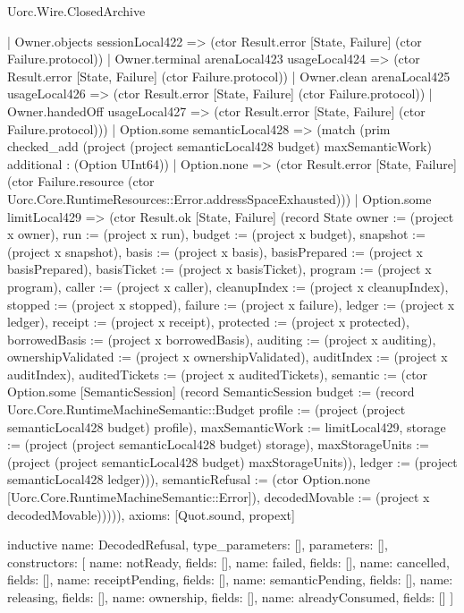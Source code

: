 \begin{lexlean}{Uorc.Wire.ClosedArchive}
\begin{semanticmodule}
{      | Owner.objects sessionLocal422 => (ctor Result.error [State, Failure] (ctor Failure.protocol))
      | Owner.terminal arenaLocal423 usageLocal424 => (ctor Result.error [State, Failure] (ctor Failure.protocol))
      | Owner.clean arenaLocal425 usageLocal426 => (ctor Result.error [State, Failure] (ctor Failure.protocol))
      | Owner.handedOff usageLocal427 => (ctor Result.error [State, Failure] (ctor Failure.protocol)))
    | Option.some semanticLocal428 => (match (prim checked_add (project (project semanticLocal428 budget) maxSemanticWork) additional : (Option UInt64))
      | Option.none => (ctor Result.error [State, Failure] (ctor Failure.resource (ctor Uorc.Core.RuntimeResources::Error.addressSpaceExhausted)))
      | Option.some limitLocal429 => (ctor Result.ok [State, Failure] (record State {owner := (project x owner), run := (project x run), budget := (project x budget), snapshot := (project x snapshot), basis := (project x basis), basisPrepared := (project x basisPrepared), basisTicket := (project x basisTicket), program := (project x program), caller := (project x caller), cleanupIndex := (project x cleanupIndex), stopped := (project x stopped), failure := (project x failure), ledger := (project x ledger), receipt := (project x receipt), protected := (project x protected), borrowedBasis := (project x borrowedBasis), auditing := (project x auditing), ownershipValidated := (project x ownershipValidated), auditIndex := (project x auditIndex), auditedTickets := (project x auditedTickets), semantic := (ctor Option.some [SemanticSession] (record SemanticSession {budget := (record Uorc.Core.RuntimeMachineSemantic::Budget {profile := (project (project semanticLocal428 budget) profile), maxSemanticWork := limitLocal429, storage := (project (project semanticLocal428 budget) storage), maxStorageUnits := (project (project semanticLocal428 budget) maxStorageUnits)}), ledger := (project semanticLocal428 ledger)})), semanticRefusal := (ctor Option.none [Uorc.Core.RuntimeMachineSemantic::Error]), decodedMovable := (project x decodedMovable)})))),
  axioms: [Quot.sound, propext]
}

inductive{
  name: DecodedRefusal,
  type_parameters: [],
  parameters: [],
  constructors: [
    {name: notReady, fields: []},
    {name: failed, fields: []},
    {name: cancelled, fields: []},
    {name: receiptPending, fields: []},
    {name: semanticPending, fields: []},
    {name: releasing, fields: []},
    {name: ownership, fields: []},
    {name: alreadyConsumed, fields: []}
  ]
}


\end{semanticmodule}
\end{lexlean}
